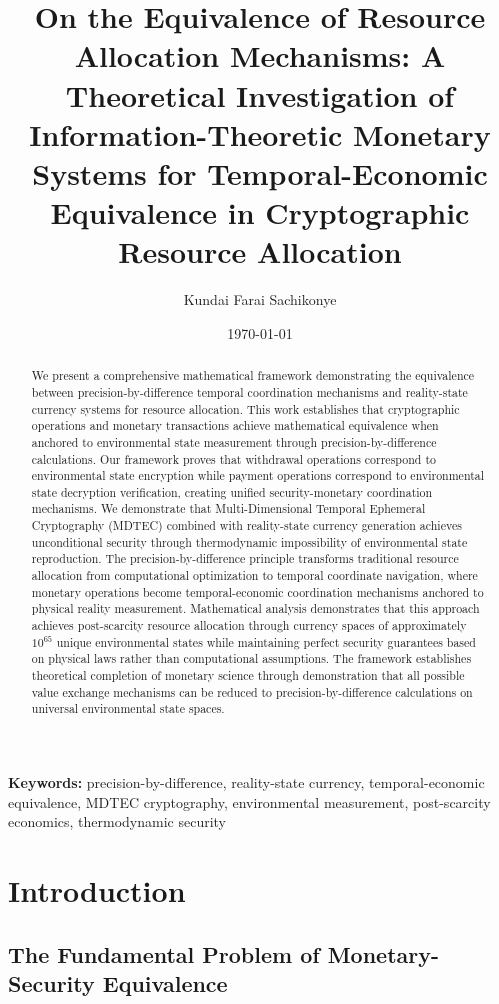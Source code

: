 \documentclass[12pt,a4paper]{article}
\title{\textbf{On the Equivalence of Resource Allocation Mechanisms: A Theoretical Investigation of Information-Theoretic Monetary Systems for Temporal-Economic Equivalence in Cryptographic Resource Allocation}}
\author{Kundai Farai Sachikonye}
\date{\today}
\begin{document}
\maketitle

\begin{abstract}
We present a comprehensive mathematical framework demonstrating the equivalence between precision-by-difference temporal coordination mechanisms and reality-state currency systems for resource allocation. This work establishes that cryptographic operations and monetary transactions achieve mathematical equivalence when anchored to environmental state measurement through precision-by-difference calculations. Our framework proves that withdrawal operations correspond to environmental state encryption while payment operations correspond to environmental state decryption verification, creating unified security-monetary coordination mechanisms. We demonstrate that Multi-Dimensional Temporal Ephemeral Cryptography (MDTEC) combined with reality-state currency generation achieves unconditional security through thermodynamic impossibility of environmental state reproduction. The precision-by-difference principle transforms traditional resource allocation from computational optimization to temporal coordinate navigation, where monetary operations become temporal-economic coordination mechanisms anchored to physical reality measurement. Mathematical analysis demonstrates that this approach achieves post-scarcity resource allocation through currency spaces of approximately $10^{65}$ unique environmental states while maintaining perfect security guarantees based on physical laws rather than computational assumptions. The framework establishes theoretical completion of monetary science through demonstration that all possible value exchange mechanisms can be reduced to precision-by-difference calculations on universal environmental state spaces.
\end{abstract}

\textbf{Keywords:} precision-by-difference, reality-state currency, temporal-economic equivalence, MDTEC cryptography, environmental measurement, post-scarcity economics, thermodynamic security

\section{Introduction}

\subsection{The Fundamental Problem of Monetary-Security Equivalence}
\end{document}
